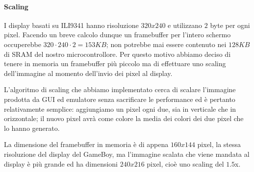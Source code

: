 \documentclass[hidelinks,12pt]{article}
\begin{document}
\paragraph{Scaling}
I display basati su ILI9341 hanno risoluzione $320x240$ e utilizzano $2$ byte
per ogni pixel. Facendo un breve calcolo dunque un framebuffer per l'intero
schermo occuperebbe $320 \cdot 240 \cdot 2 = 153KB$; non potrebbe mai essere
contenuto nei $128KB$ di SRAM del nostro microcontrollore.
Per questo motivo abbiamo deciso di tenere in memoria un framebuffer
più piccolo ma di effettuare uno scaling dell'immagine al momento dell'invio
dei pixel al display. 

L'algoritmo di scaling che abbiamo implementato cerca di scalare l'immagine
prodotta da GUI ed emulatore senza sacrificare le performance ed è pertanto
relativamente semplice: aggiungiamo un pixel ogni due, sia in verticale che in
orizzontale; il nuovo pixel avrà come colore la media dei colori dei due pixel
che lo hanno generato.

La dimensione del framebuffer in memoria è di appena $160x144$ pixel, la
stessa risoluzione del display del GameBoy, ma l'immagine scalata che viene
mandata al display è più grande ed ha dimensioni $240x216$ pixel, cioè uno
scaling del $1.5$x.
\end{document}
